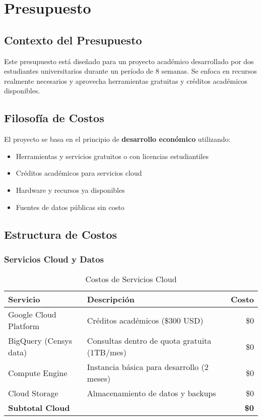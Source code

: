 \section{Presupuesto}

\subsection{Contexto del Presupuesto}

Este presupuesto está diseñado para un proyecto académico desarrollado por dos estudiantes universitarios durante un período de 8 semanas. Se enfoca en recursos realmente necesarios y aprovecha herramientas gratuitas y créditos académicos disponibles.

\subsection{Filosofía de Costos}

El proyecto se basa en el principio de \textbf{desarrollo económico} utilizando:
\begin{itemize}
    \item Herramientas y servicios gratuitos o con licencias estudiantiles
    \item Créditos académicos para servicios cloud
    \item Hardware y recursos ya disponibles
    \item Fuentes de datos públicas sin costo
\end{itemize}

\subsection{Estructura de Costos}

\subsubsection{Servicios Cloud y Datos}

\begin{table}[H]
    \centering
    \small
    \begin{tabular}{|l|l|r|}
        \hline
        \textbf{Servicio} & \textbf{Descripción} & \textbf{Costo} \\
        \hline
        Google Cloud Platform & Créditos académicos (\$300 USD) & \$0 \\
        \hline
        BigQuery (Censys data) & Consultas dentro de quota gratuita (1TB/mes) & \$0 \\
        \hline
        Compute Engine & Instancia básica para desarrollo (2 meses) & \$0 \\
        \hline
        Cloud Storage & Almacenamiento de datos y backups & \$0 \\
        \hline
        \textbf{Subtotal Cloud} & & \textbf{\$0} \\
        \hline
    \end{tabular}
    \caption{Costos de Servicios Cloud}
    \label{tab:costos_cloud}
\end{table}

